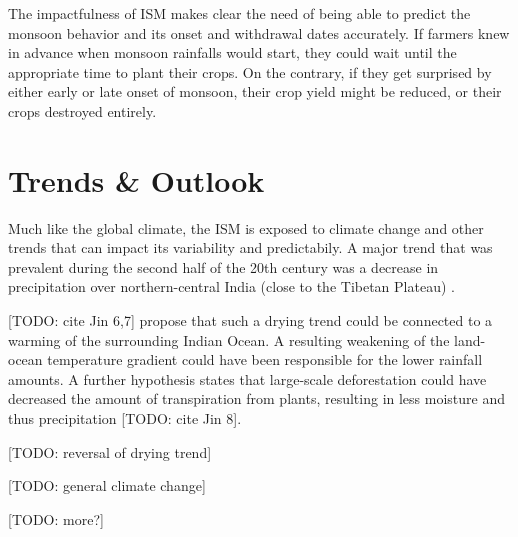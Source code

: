 The impactfulness of ISM makes clear the need of being able to predict the monsoon behavior and its onset and withdrawal dates accurately. If farmers knew in advance when monsoon rainfalls would start, they could wait until the appropriate time to plant their crops. On the contrary, if they get surprised by either early or late onset of monsoon, their crop yield might be reduced, or their crops destroyed entirely.

\section{Trends \& Outlook}
\label{st:ism_trends}
Much like the global climate, the ISM is exposed to climate change and other trends that can impact its variability and predictabily. A major trend that was prevalent during the second half of the 20th century was a decrease in precipitation over northern-central India (close to the Tibetan Plateau) \citep{Jin.2017}.

[TODO: cite Jin 6,7] propose that such a drying trend could be connected to a warming of the surrounding Indian Ocean. A resulting weakening of the land-ocean temperature gradient could have been responsible for the lower rainfall amounts. A further hypothesis states that large-scale deforestation could have decreased the amount of transpiration from plants, resulting in less moisture and thus precipitation [TODO: cite Jin 8].

[TODO: reversal of drying trend]

[TODO: general climate change]

[TODO: more?]





